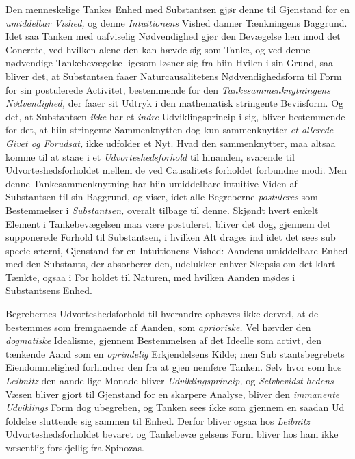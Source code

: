 Den menneskelige Tankes Enhed med Substantsen gjør
denne til Gjenstand for en \emph{umiddelbar Vished,} og denne
\emph{Intuitionens} Vished danner Tænkningens Baggrund. Idet saa
Tanken med uafviselig Nødvendighed gjør den Bevægelse hen
imod det Concrete, ved hvilken alene den kan hævde sig som
Tanke, og ved denne nødvendige Tankebevægelse ligesom
løsner sig fra hiin Hvilen i sin Grund, saa bliver det, at
Substantsen faaer Naturcausalitetens Nødvendighedsform til
Form for sin postulerede Activitet, bestemmende for den
\emph{Tankesammenknytningens Nødvendighed,} der faaer
sit Udtryk i den mathematisk stringente Beviisform. Og det,
at Substantsen \emph{ikke} har et \emph{indre} Udviklingsprincip i sig,
bliver bestemmende for det, at hiin stringente Sammenknytten
dog kun sammenknytter \emph{et allerede Givet og Forudsat,}
ikke udfolder et Nyt. Hvad den sammenknytter, maa altsaa
komme til at staae i et \emph{Udvorteshedsforhold} til hinanden,
svarende til Udvorteshedsforholdet mellem de ved Causalitets\-%
forholdet forbundne modi. Men denne Tankesammenknytning
har hiin umiddelbare intuitive Viden af Substantsen til sin
Baggrund, og viser, idet alle Begreberne \emph{postuleres} som
Bestemmelser i \emph{Substantsen,} overalt tilbage til denne.
Skjøndt hvert enkelt Element i Tankebevægelsen maa være
postuleret, bliver det dog, gjennem det supponerede Forhold
til Substantsen, i hvilken Alt drages ind idet det sees sub
specie æterni, Gjenstand for en Intuitionens Vished: Aandens
umiddelbare Enhed med den Substants, der absorberer den,
udelukker enhver Skepsis om det klart Tænkte, ogsaa i For\-%
holdet til Naturen, med hvilken Aanden mødes i Substantsens
Enhed.

Begrebernes Udvorteshedsforhold til hverandre ophæves
ikke derved, at de bestemmes som fremgaaende af Aanden,
som \emph{aprioriske.} Vel hævder den \emph{dogmatiske} Idealisme,
gjennem Bestemmelsen af det Ideelle som activt, den tænkende
Aand som en \emph{oprindelig} Erkjendelsens Kilde; men Sub\-%
stantsbegrebets Eiendommelighed forhindrer den fra at gjen\-%
nemføre Tanken. Selv hvor som hos \emph{Leibnitz} den aande\-%
lige Monade bliver \emph{Udviklingsprincip,} og \emph{Selvbevidst\-%
hedens} Væsen bliver gjort til Gjenstand for en skarpere
Analyse, bliver den \emph{immanente Udviklings} Form dog
ubegreben, og Tanken sees ikke som gjennem en saadan Ud\-%
foldelse sluttende sig sammen til Enhed. Derfor bliver ogsaa
hos \emph{Leibnitz} Udvorteshedsforholdet bevaret og Tankebevæ\-%
gelsens Form bliver hos ham ikke væsentlig forskjellig fra
Spinozas.

